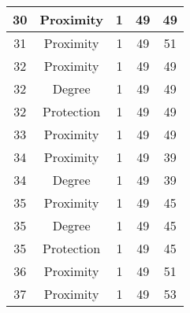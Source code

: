 \documentclass[results.tex]{subfiles}
\begin{document}
\begin{center}
\begin{tabular}{| c || c | c | c | c |}
            \hline
            30                      & Proximity                    & 1                      & 49                      & 49                   \\
            \hline
            31                      & Proximity                    & 1                      & 49                      & 51                   \\
            \hline
            32                      & Proximity                    & 1                      & 49                      & 49                   \\
            \hline
            32                      & Degree                       & 1                      & 49                      & 49                   \\
            \hline
            32                      & Protection                   & 1                      & 49                      & 49                   \\
            \hline
            33                      & Proximity                    & 1                      & 49                      & 49                   \\
            \hline
            34                      & Proximity                    & 1                      & 49                      & 39                   \\
            \hline
            34                      & Degree                       & 1                      & 49                      & 39                   \\
            \hline
            35                      & Proximity                    & 1                      & 49                      & 45                   \\
            \hline
            35                      & Degree                       & 1                      & 49                      & 45                   \\
            \hline
            35                      & Protection                   & 1                      & 49                      & 45                   \\
            \hline
            36                      & Proximity                    & 1                      & 49                      & 51                   \\
            \hline
            37                      & Proximity                    & 1                      & 49                      & 53                   \\

\end{tabular}
\end{center}
\end{document}
